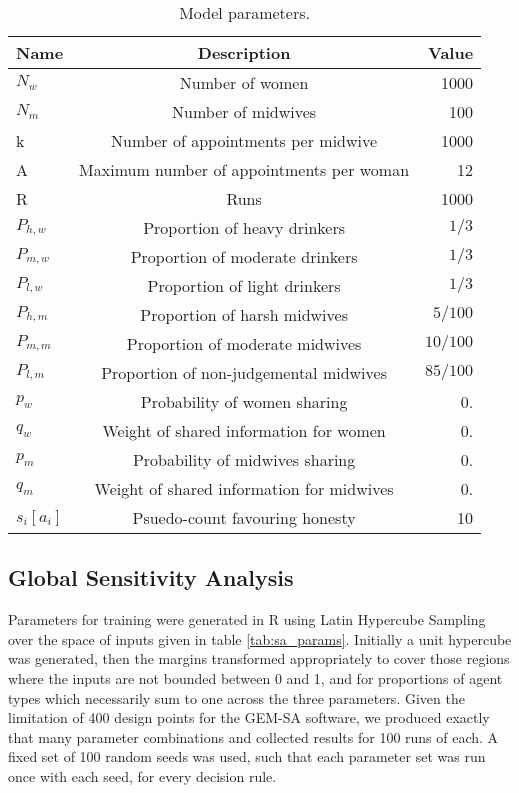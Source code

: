 \begin{table}
\center
\begin{tabular} {|l | c | r|}
\hline
Name & Description & Value \\ \hline
\(N_{w}\) & Number of women & 1000 \\ \hline
\(N_{m}\) & Number of midwives & 100 \\ \hline
k & Number of appointments per midwive & 1000 \\ \hline
A & Maximum number of appointments per woman & 12 \\ \hline
R & Runs & 1000 \\ \hline
\(P_{h,w}\) & Proportion of heavy drinkers & \(1/3\) \\ \hline
\(P_{m,w}\) & Proportion of moderate drinkers & \(1/3\) \\ \hline
\(P_{l,w}\) & Proportion of light drinkers & \(1/3\) \\ \hline
\(P_{h,m}\) & Proportion of harsh midwives & \(5/100\) \\ \hline
\(P_{m,m}\) & Proportion of moderate midwives & \(10/100\) \\ \hline
\(P_{l,m}\) & Proportion of non-judgemental midwives & \(85/100\) \\ \hline
\(p_{w}\) & Probability of women sharing & 0. \\ \hline
\(q_{w}\) & Weight of shared information for women & 0. \\ \hline
\(p_{m}\) & Probability of midwives sharing & 0. \\ \hline
\(q_{m}\) & Weight of shared information for midwives & 0. \\ \hline
\(s_{i}[a_{i}]\) & Psuedo-count favouring honesty & 10 \\ \hline
\end{tabular}
\caption[Table caption text]{Model parameters. \label{tab:qt_params}}
\end{table}
\subsection{Global Sensitivity Analysis}
\label{sub:sensitivity}
 \cite{Bijak2013b}

Parameters for training were generated in R \citep{RTeam2014} using Latin Hypercube Sampling \citep{Carnell2012} over the space of inputs given in table \ref{tab:sa_params}. Initially a unit hypercube was generated, then the margins transformed appropriately to cover those regions where the inputs are not bounded between 0 and 1, and for proportions of agent types which necessarily sum to one across the three parameters. Given the limitation of 400 design points for the \ac{GEM-SA} software, we produced exactly that many parameter combinations and collected results for 100 runs of each. A fixed set of 100 random seeds was used, such that each parameter set was run once with each seed, for every decision rule.

